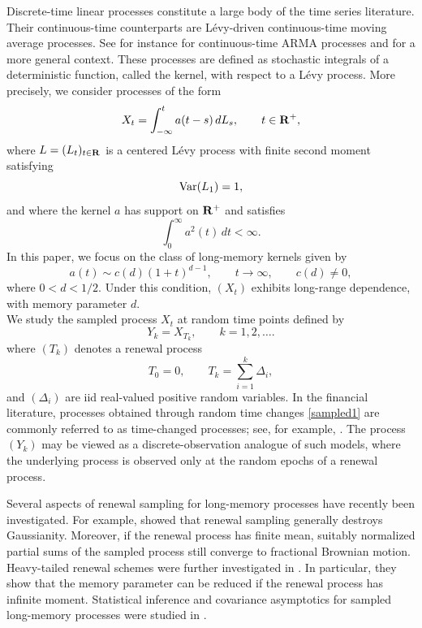 \documentclass[preprint,12pt]{article}
\begin{document}
Discrete-time linear processes constitute a large body of the time series literature.
Their continuous-time counterparts are L\'evy-driven continuous-time moving average processes. See for instance \cite{Brockwell2001} for continuous-time ARMA processes and \cite{BrockwellFerrazzanoKlueppelberg2013,CohenLindner2013,BAI20161036} for a more general context. 
These processes are defined as stochastic integrals of a deterministic function, called the kernel, with respect to a L\'evy process. More precisely, we consider processes of the form
\begin{equation}\label{CMA}
X_t=\int_{-\infty}^{t} a(t-s)\,dL_s, \qquad t\in {\bf R}^{+},
\end{equation}
where $L=(L_t)_{t\in {\bf R}}$ is a centered L\'evy process with finite second moment satisfying
\begin{equation*}
{\rm Var}(L_1)=1,
\end{equation*}
and where the kernel $a$ has support on ${\bf R}^{+}$ and satisfies
\begin{equation}\label{finite 2}
\int_0^\infty a^2(t)\,dt<\infty.
\end{equation}
In this paper, we focus on the class of long-memory kernels given by
\begin{equation}\label{a}
a(t)\sim c(d)(1+t)^{d-1}, \qquad t\to\infty, \qquad c(d)\neq0,
\end{equation}
where $0<d<1/2$. Under this condition, $(X_t)$ exhibits long-range dependence, with memory parameter $d$.\\
We study the sampled process $X_t$ at random time points defined by
\begin{equation}\label{sampled1}
Y_k=X_{T_k}, \qquad k=1,2,\ldots.
\end{equation}
where  
 $(T_k)$ denotes a renewal process
 \begin{equation*}
T_0=0, \qquad T_k=\sum_{i=1}^{k}\Delta_i,
\end{equation*}
and $(\Delta_i)$ are iid real-valued positive random variables. 
In the financial literature, processes obtained through random time changes \eqref{sampled1} are commonly referred to as time-changed processes; see, for example, \cite{GemanAne2000,GemanMadanYor2001}. The process $(Y_k)$ may be viewed as a discrete-observation analogue of such models, where the underlying process is observed only at the random epochs of a renewal process.


Several aspects of renewal sampling for long-memory processes have recently been investigated. For example, \cite{PhilippeRobetViano} showed that renewal sampling generally destroys Gaussianity. Moreover, if the renewal process has finite mean, suitably normalized partial sums of the sampled process still converge to fractional Brownian motion. Heavy-tailed renewal schemes were further investigated in \cite{philippe-viano2008}. In particular, they show that the memory parameter can be reduced if the renewal process has infinite moment. Statistical inference and covariance asymptotics for sampled long-memory processes were studied in \cite{OuldHaye2023}.
\end{document}
